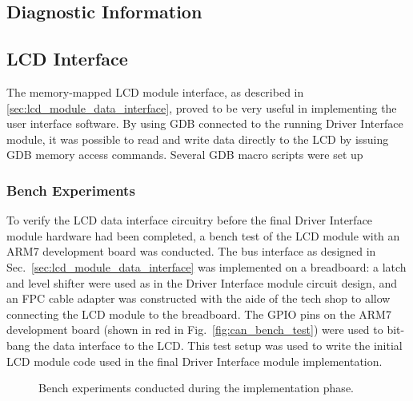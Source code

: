 \subsection{Diagnostic Information}


\subsection{LCD Interface}

The memory-mapped LCD module interface, as described in \ref{sec:lcd_module_data_interface}, proved to be very useful in implementing the user interface software. By using GDB connected to the running Driver Interface module, it was possible to read and write data directly to the LCD by issuing GDB memory access commands. Several GDB macro scripts were set up

\subsubsection{Bench Experiments}

To verify the LCD data interface circuitry before the final Driver Interface module hardware had been completed, a bench test of the LCD module with an ARM7 development board was conducted. The bus interface as designed in Sec.\ \ref{sec:lcd_module_data_interface} was implemented on a breadboard: a latch and level shifter were used as in the Driver Interface module circuit design, and an FPC cable adapter was constructed with the aide of the tech shop to allow connecting the LCD module to the breadboard. The GPIO pins on the ARM7 development board (shown in red in Fig.\ \ref{fig:can_bench_test}) were used to bit-bang the data interface to the LCD. This test setup was used to write the initial LCD module code used in the final Driver Interface module implementation.

\begin{figure}[h!]
\centering
{}
\caption{Bench experiments conducted during the implementation phase.}
\label{fig:bench_experiments}
\end{figure}

